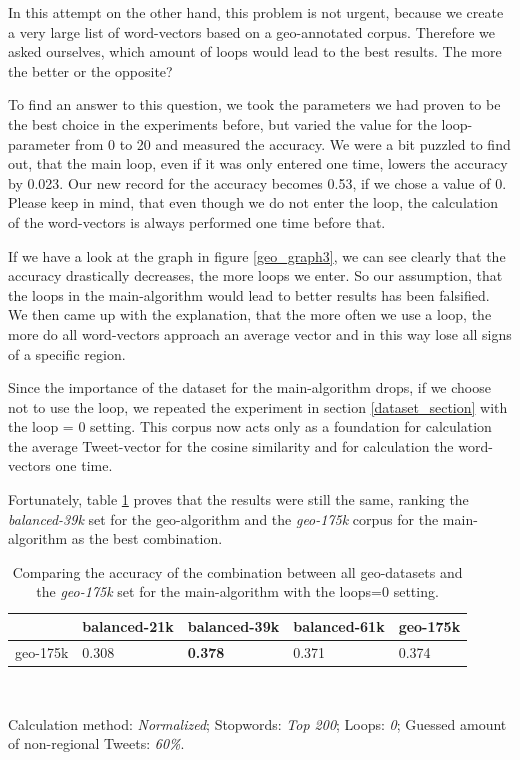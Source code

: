 \documentclass[../Main.tex]{subfiles}
\begin{document}
In this attempt on the other hand, this problem is not urgent, because we create a very large list of word-vectors based on a geo-annotated corpus. Therefore we asked ourselves, which amount of loops would lead to the best results. The more the better or the opposite? 

To find an answer to this question, we took the parameters we had proven to be the best choice in the experiments before, but varied the value for the loop-parameter from 0 to 20 and measured the accuracy. 
We were a bit puzzled to find out, that the main loop, even if it was only entered one time, lowers the accuracy by 0.023. Our new record for the accuracy becomes 0.53, if we chose a value of 0. Please keep in mind, that even though we do not enter the loop, the calculation of the word-vectors is always performed one time before that.

If we have a look at the graph in figure \ref{geo_graph3}, we can see clearly  that the accuracy drastically decreases, the more loops we enter. So our assumption, that the loops in the main-algorithm would lead to better results has been falsified. We then came up with the explanation, that the more often we use a loop, the more do all word-vectors approach an average vector and in this way lose all signs of a specific region.

Since the importance of the dataset for the main-algorithm drops, if we choose not to use the loop, we repeated the experiment in section \ref{dataset_section} with the loop = 0 setting. This corpus now acts only as a foundation for calculation the average Tweet-vector for the cosine similarity  and for calculation the word-vectors one time.

Fortunately, table \ref{geo_datasets2} proves that the results were still the same, ranking the \emph{balanced-39k} set for the geo-algorithm and the \emph{geo-175k} corpus for the main-algorithm as the best combination. 

\begin{table}
\begin{center}
    \begin{tabular}{|l|llll|}
    \hline
                  & balanced-21k & balanced-39k   & balanced-61k & geo-175k \\ \hline
    geo-175k    & 0.308        & \textbf{0.378} & 0.371        & 0.374    \\ \hline
    \end{tabular} \\
\end{center}
  Calculation method: \textit{Normalized}; Stopwords: \textit{Top 200}; Loops: \textit{0}; Guessed amount of non-regional Tweets: \textit{60\%}.
  \caption{Comparing the accuracy of the combination between all geo-datasets and the \emph{geo-175k} set for the main-algorithm with the loops=0 setting.}
  \label{geo_datasets2}
\end{table}
\end{document}
